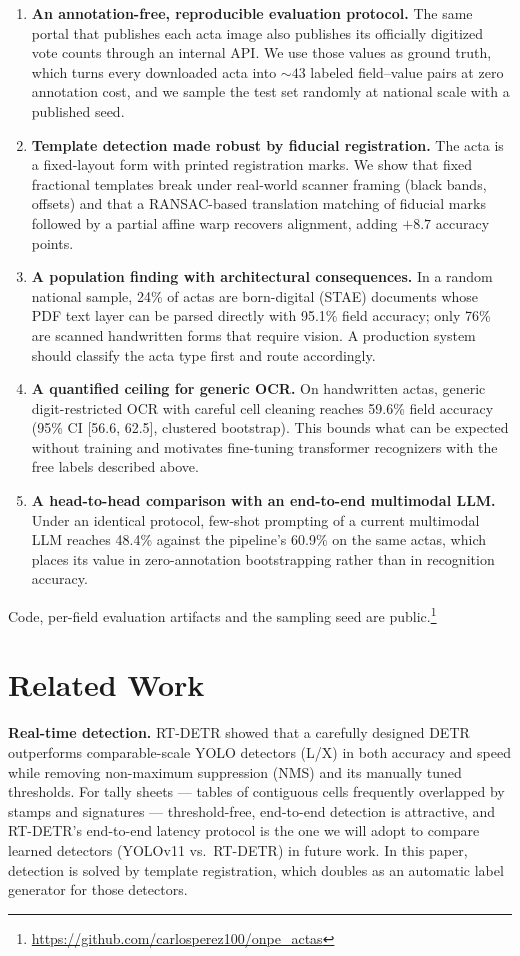 \documentclass[conference]{IEEEtran}
\begin{document}
\begin{enumerate}
\item \textbf{An annotation-free, reproducible evaluation protocol.} The same
portal that publishes each acta image also publishes its officially digitized
vote counts through an internal API. We use those values as ground truth,
which turns every downloaded acta into ${\sim}43$ labeled field--value pairs
at zero annotation cost, and we sample the test set randomly at national
scale with a published seed.
\item \textbf{Template detection made robust by fiducial registration.} The
acta is a fixed-layout form with printed registration marks. We show that
fixed fractional templates break under real-world scanner framing (black
bands, offsets) and that a RANSAC-based translation matching of fiducial
marks followed by a partial affine warp recovers alignment, adding $+8.7$
accuracy points.
\item \textbf{A population finding with architectural consequences.} In a
random national sample, 24\% of actas are born-digital (STAE) documents whose
PDF text layer can be parsed directly with 95.1\% field accuracy; only 76\%
are scanned handwritten forms that require vision. A production system should
classify the acta type first and route accordingly.
\item \textbf{A quantified ceiling for generic OCR.} On handwritten actas,
generic digit-restricted OCR with careful cell cleaning reaches 59.6\% field
accuracy (95\% CI [56.6, 62.5], clustered bootstrap). This bounds what can be
expected without training and motivates fine-tuning transformer recognizers
with the free labels described above.
\item \textbf{A head-to-head comparison with an end-to-end multimodal LLM.}
Under an identical protocol, few-shot prompting of a current multimodal LLM
reaches 48.4\% against the pipeline's 60.9\% on the same actas, which places
its value in zero-annotation bootstrapping rather than in recognition
accuracy.
\end{enumerate}

Code, per-field evaluation artifacts and the sampling seed are
public.\footnote{\url{https://github.com/carlosperez100/onpe_actas}}

\section{Related Work}
\textbf{Real-time detection.} RT-DETR \cite{rtdetr} showed that a carefully
designed DETR outperforms comparable-scale YOLO detectors (L/X) in both
accuracy and speed while
removing non-maximum suppression (NMS) and its manually tuned thresholds. For
tally sheets --- tables of contiguous cells frequently overlapped by stamps
and signatures --- threshold-free, end-to-end detection is attractive, and
RT-DETR's end-to-end latency protocol is the one we will adopt to compare
learned detectors (YOLOv11 vs.\ RT-DETR) in future work. In this paper, detection is
solved by template registration, which doubles as an automatic label
generator for those detectors.
\end{document}
